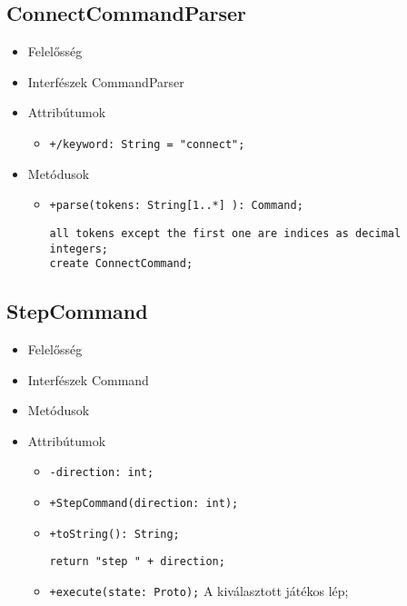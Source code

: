 \subsection{ConnectCommandParser}
\begin{itemize}
\item Felelősség\newline
\item Interfészek\newline
CommandParser
\item Attribútumok
	\begin{itemize}
		\item \texttt{+/keyword: String = "connect";}
	\end{itemize}
\item Metódusok
\begin{itemize}
		\item \texttt{+parse(tokens: String[1..*] ): Command;}
		\begin{lstlisting}
all tokens except the first one are indices as decimal integers;
create ConnectCommand;
		\end{lstlisting}
	\end{itemize}
\end{itemize}

\subsection{StepCommand}
\begin{itemize}
\item Felelősség\newline
\item Interfészek\newline
Command
\item Metódusok
\item Attribútumok
	\begin{itemize}
		\item \texttt{-direction: int;}
	\end{itemize}
\begin{itemize}
		\item \texttt{+StepCommand(direction: int);}
		\item \texttt{+toString(): String;}
		\begin{lstlisting}
return "step " + direction;
		\end{lstlisting}
		\item \texttt{+execute(state: Proto);} \newline
		A kiválasztott játékos lép;
	\end{itemize}
\end{itemize}
